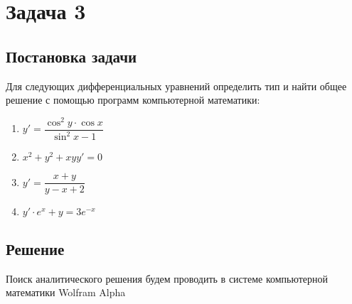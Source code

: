\newcommand{\equationFirst}{
	{y}' = \dfrac{\cos^{2}{y} \cdot \cos{x}}{\sin^2{x} - 1}
}

\newcommand{\equationSecond}{
	{x}^2 + {y}^2 + xyy' = 0 
}

\newcommand{\equationThird}{
	{y}' = \dfrac{x + y}{y - x + 2}
}

\newcommand{\equationFourth}{
	{y}' \cdot e^{x} + {y} = 3e^{-x}
}

\section{Задача 3}
\subsection{Постановка задачи}
Для следующих дифференциальных уравнений определить тип и найти общее решение с помощью программ компьютерной математики:

\begin{enumerate}                                                   
	\item $ \equationFirst $          
	\item $ \equationSecond $
	\item $ \equationThird $                             
	\item $ \equationFourth $
\end{enumerate}

\subsection{Решение}

Поиск аналитического решения будем проводить в системе компьютерной математики Wolfram Alpha

